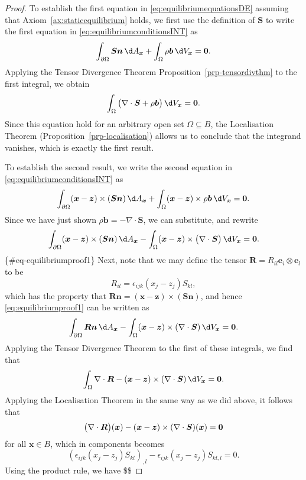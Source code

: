 \documentclass[
  letterpaper,
  DIV=11,
  numbers=noendperiod]{scrreprt}
\theoremstyle{plain}
\theoremstyle{remark}
\begin{document}
\begin{proof}
To establish the first equation in
\hyperref[eq:equilibriumequationsDE]{{[}eq:equilibriumequationsDE{]}}
assuming that
Axiom~\hyperref[ax:staticequilibrium]{{[}ax:staticequilibrium{]}} holds,
we first use the definition of \({\boldsymbol{S}}\) to write the first
equation in
\hyperref[eq:equilibriumconditionsINT]{{[}eq:equilibriumconditionsINT{]}}
as
\[\int_{\partial \Omega}{\boldsymbol{S}}{\boldsymbol{n}}{\,\d A_{{\boldsymbol{x}}}}+\int_\Omega\rho{\boldsymbol{b}}{\,\d V_{{\boldsymbol{x}}}}=\bf0.\]
Applying the Tensor Divergence Theorem
Proposition~\ref{prp-tensordivthm} to the first integral, we obtain
\[\int_\Omega \big(\nabla\cdot{\boldsymbol{S}}+\rho{\boldsymbol{b}}\big){\,\d V_{{\boldsymbol{x}}}}=\bf0.\]
Since this equation hold for an arbitrary open set
\(\Omega\subseteq B\), the Localisation Theorem
(Proposition~\ref{prp-localisation}) allows us to conclude that the
integrand vanishes, which is exactly the first result.

To establish the second result, we write the second equation in
\hyperref[eq:equilibriumconditionsINT]{{[}eq:equilibriumconditionsINT{]}}
as
\[\int_{\partial\Omega} ({\boldsymbol{x}}-{\boldsymbol{z}})\times ({\boldsymbol{S}}{\boldsymbol{n}}){\,\d A_{{\boldsymbol{x}}}}+\int_\Omega ({\boldsymbol{x}}-{\boldsymbol{z}})\times\rho{\boldsymbol{b}}{\,\d V_{{\boldsymbol{x}}}}=\bf0.\]
Since we have just shown
\(\rho{\boldsymbol{b}}=-\nabla\cdot{\boldsymbol{S}}\), we can
substitute, and rewrite \[
    \int_{\partial\Omega} ({\boldsymbol{x}}-{\boldsymbol{z}})\times ({\boldsymbol{S}}{\boldsymbol{n}}){\,\d A_{{\boldsymbol{x}}}}-\int_\Omega ({\boldsymbol{x}}-{\boldsymbol{z}})\times\big(\nabla\cdot{\boldsymbol{S}}\big){\,\d V_{{\boldsymbol{x}}}}=\bf0.\]
\{\#eq-equilibriumproof1\} Next, note that we may define the tensor
\({\boldsymbol{R}}=R_{il}{\boldsymbol{e}}_i\otimes{\boldsymbol{e}}_l\)
to be \[R_{il} = \epsilon_{ijk}(x_j-z_j)S_{kl},\] which has the property
that
\({\boldsymbol{R}}{\boldsymbol{n}}=({\boldsymbol{x}}-{\boldsymbol{z}})\times({\boldsymbol{S}}{\boldsymbol{n}})\),
and hence \hyperref[eq:equilibriumproof1]{{[}eq:equilibriumproof1{]}}
can be written as
\[\int_{\partial\Omega}{\boldsymbol{R}}{\boldsymbol{n}}{\,\d A_{{\boldsymbol{x}}}}-\int_\Omega ({\boldsymbol{x}}-{\boldsymbol{z}})\times(\nabla\cdot {\boldsymbol{S}}){\,\d V_{{\boldsymbol{x}}}}=\bf0.\]
Applying the Tensor Divergence Theorem to the first of these integrals,
we find that
\[\int_\Omega\nabla\cdot {\boldsymbol{R}}- ({\boldsymbol{x}}-{\boldsymbol{z}})\times(\nabla\cdot {\boldsymbol{S}}){\,\d V_{{\boldsymbol{x}}}}=\bf0.\]
Applying the Localisation Theorem in the same way as we did above, it
follows that
\[\big(\nabla\cdot{\boldsymbol{R}}\big)({\boldsymbol{x}})-({\boldsymbol{x}}-{\boldsymbol{z}})\times(\nabla\cdot{\boldsymbol{S}})({\boldsymbol{x}})=\bf0\]
for all \({\boldsymbol{x}}\in B\), which in components becomes
\[(\epsilon_{ijk}(x_j-z_j)S_{kl})_{,l}-\epsilon_{ijk}(x_j-z_j)S_{kl,l}=0.\]
Using the product rule, we have \$\$


\end{proof}
\end{document}
